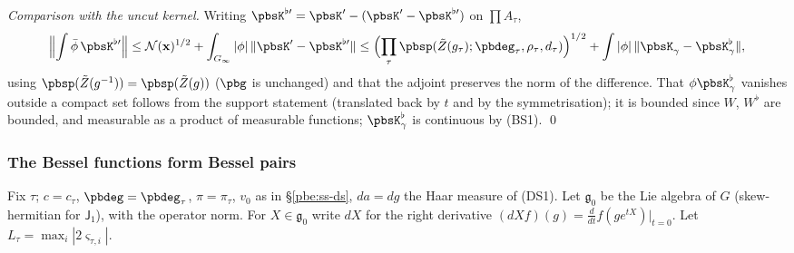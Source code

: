 \documentclass[10pt]{amsart}
\theoremstyle{definition}
\theoremstyle{remark}
\begin{document}
\emph{Comparison with the uncut kernel.} Writing $\pbsK^{\flat\prime}=\pbsK'-(\pbsK'-\pbsK^{\flat\prime})$ on
$\prod A_\tau$,
\[
\Bigl\|\int\bar\phi\,\pbsK^{\flat\prime}\Bigr\|\le\mathcal N(\mathbf x)^{1/2}+\int_{G_\infty}|\phi|\,\|\pbsK'-
\pbsK^{\flat\prime}\|\le\Bigl(\prod_\tau\pbsp(\tilde Z(g_\tau);\pbdeg_\tau,\rho_\tau,d_\tau)\Bigr)^{1/2}+\int|\phi|\,
\|\pbsK_\gamma-\pbsK^\flat_\gamma\| ,
\]
using $\pbsp(\tilde Z(g^{-1}))=\pbsp(\tilde Z(g))$ ($\pbg$ is unchanged) and that the adjoint preserves the norm of
the difference. That $\phi\pbsK^\flat_\gamma$ vanishes outside a compact set follows from the support statement (translated back by $t$ and by the symmetrisation); it is bounded since $W$, $W^\flat$ are bounded, and measurable as a product of measurable functions; $\pbsK^\flat_\gamma$ is continuous by \textup{(BS1)}. \qed

\subsubsection{The Bessel functions form Bessel pairs}\label{pbo:ss-pairs}

Fix $\tau$; $c=c_\tau$, $\pbdeg=\pbdeg_\tau$, $\pi=\pi_\tau$, $v_0$ as in \S\ref{pbe:ss-ds}, $da=dg$ the Haar measure
of \textup{(DS1)}. Let $\mathfrak g_0$ be the Lie algebra of $G$ (skew-hermitian for $\mathsf J_1$), with the
operator norm. For $X\in\mathfrak g_0$ write $dX$ for the right derivative $(dXf)(g)=\frac d{dt}f(ge^{tX})|_{t=0}$.
Let $L_\tau=\max_i|2\varsigma_{\tau,i}|$.
\end{document}
